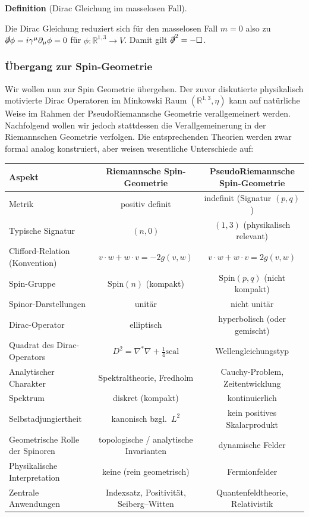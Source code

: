 \documentclass[10pt, letterpaper]{article}
\newcommand{\R}{\mathbb{R}}
\newcommand{\CustomHeading}[3]{%
  \par\medskip\noindent%
  \textbf{#1 #2} \textnormal{(#3)}.\enskip%
}
\newenvironment{DEF}[2]{\CustomHeading{Definition}{#1}{#2}}{}
\begin{document}
\begin{DEF}{}{Dirac Gleichung im masselosen Fall}
  Die Dirac Gleichung reduziert sich für den masselosen Fall $m=0$ also zu $\slashed{\partial}\phi=i\gamma^\mu \partial_\mu \phi=0$ für $\phi:\R^{1,3}\to V$. Damit gilt $\slashed{\partial}^2=-\square$.
\end{DEF}


\subsubsection{Übergang zur Spin-Geometrie}

Wir wollen nun zur Spin Geometrie übergehen. Der zuvor diskutierte physikalisch motivierte Dirac Operatoren im Minkowski Raum $(\R^{1,3},\eta)$ kann auf natürliche Weise im Rahmen der PseudoRiemannsche Geometrie verallgemeinert werden. Nachfolgend wollen wir jedoch stattdessen die Verallgemeinerung in der Riemannschen Geometrie verfolgen. Die entsprechenden Theorien werden zwar formal analog konstruiert, aber weisen wesentliche Unterschiede auf:

\begin{center}
\renewcommand{\arraystretch}{1.25}
\hspace*{-1cm}
\begin{tabular}{|l|c|c|}
\hline
\textbf{Aspekt} 
& \textbf{Riemannsche Spin-Geometrie} 
& \textbf{PseudoRiemannsche Spin-Geometrie} \\
\hline
Metrik 
& positiv definit 
& indefinit (Signatur $(p,q)$) \\
\hline
Typische Signatur 
& $(n,0)$ 
& $(1,3)$ (physikalisch relevant) \\
\hline
Clifford-Relation (Konvention)
& $v\cdot w + w\cdot v = -2g(v,w)$ 
& $v\cdot w + w\cdot v = 2g(v,w)$ \\
\hline
Spin-Gruppe 
& $\mathrm{Spin}(n)$ (kompakt) 
& $\mathrm{Spin}(p,q)$ (nicht kompakt) \\
\hline
Spinor-Darstellungen 
& unitär 
& nicht unitär \\
\hline
Dirac-Operator 
& elliptisch 
& hyperbolisch (oder gemischt) \\
\hline
Quadrat des Dirac-Operators 
& $D^2 = \nabla^*\nabla + \tfrac14\mathrm{scal}$ 
& Wellengleichungstyp \\
\hline
Analytischer Charakter 
& Spektraltheorie, Fredholm 
& Cauchy-Problem, Zeitentwicklung \\
\hline
Spektrum 
& diskret (kompakt) 
& kontinuierlich \\
\hline
Selbstadjungiertheit 
& kanonisch bzgl.\ $L^2$ 
& kein positives Skalarprodukt \\
\hline
Geometrische Rolle der Spinoren 
& topologische / analytische Invarianten 
& dynamische Felder \\
\hline
Physikalische Interpretation 
& keine (rein geometrisch) 
& Fermionfelder \\
\hline
Zentrale Anwendungen 
& Indexsatz, Positivität, Seiberg--Witten 
& Quantenfeldtheorie, Relativistik \\
\hline
\end{tabular}
\end{center}
\vspace{0.8cm}
\end{document}
